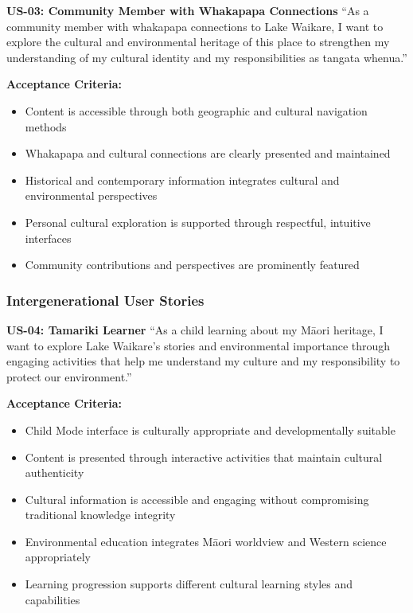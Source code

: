 \textbf{US-03: Community Member with Whakapapa Connections}
``As a community member with whakapapa connections to Lake Waikare, I want to explore the cultural and environmental heritage of this place to strengthen my understanding of my cultural identity and my responsibilities as tangata whenua.''

\textbf{Acceptance Criteria:}
\begin{itemize}
    \item Content is accessible through both geographic and cultural navigation methods
    \item Whakapapa and cultural connections are clearly presented and maintained
    \item Historical and contemporary information integrates cultural and environmental perspectives
    \item Personal cultural exploration is supported through respectful, intuitive interfaces
    \item Community contributions and perspectives are prominently featured
\end{itemize}

\subsubsection{Intergenerational User Stories}
\label{subsubsec:intergenerational_stories}

\textbf{US-04: Tamariki Learner}
``As a child learning about my M\=aori heritage, I want to explore Lake Waikare's stories and environmental importance through engaging activities that help me understand my culture and my responsibility to protect our environment.''

\textbf{Acceptance Criteria:}
\begin{itemize}
    \item Child Mode interface is culturally appropriate and developmentally suitable
    \item Content is presented through interactive activities that maintain cultural authenticity
    \item Cultural information is accessible and engaging without compromising traditional knowledge integrity
    \item Environmental education integrates M\=aori worldview and Western science appropriately
    \item Learning progression supports different cultural learning styles and capabilities
\end{itemize}

